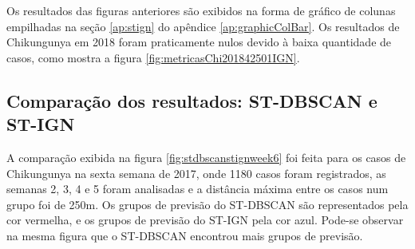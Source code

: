Os resultados das figuras anteriores são exibidos na forma de gráfico de colunas empilhadas na seção \ref{ap:stign} do apêndice \ref{ap:graphicColBar}. 
Os resultados de Chikungunya em 2018 foram praticamente nulos devido à baixa quantidade de casos, como mostra a figura \ref{fig:metricasChi201842501IGN}.



\subsection{Comparação dos resultados: ST-DBSCAN e ST-IGN}

A comparação exibida na figura \ref{fig:stdbscanstignweek6} foi feita para os casos de Chikungunya na sexta semana de 2017, onde 1180 casos foram registrados, as semanas 2, 3, 4 e 5 foram analisadas e a distância máxima entre os casos num grupo foi de 250m. Os grupos de previsão do ST-DBSCAN são representados pela cor vermelha, e os grupos de previsão do ST-IGN pela cor azul.
Pode-se observar na mesma figura que o ST-DBSCAN encontrou mais grupos de previsão.

\begin{figure}[!ht]
	\centering	
\end{figure}
\FloatBarrier


